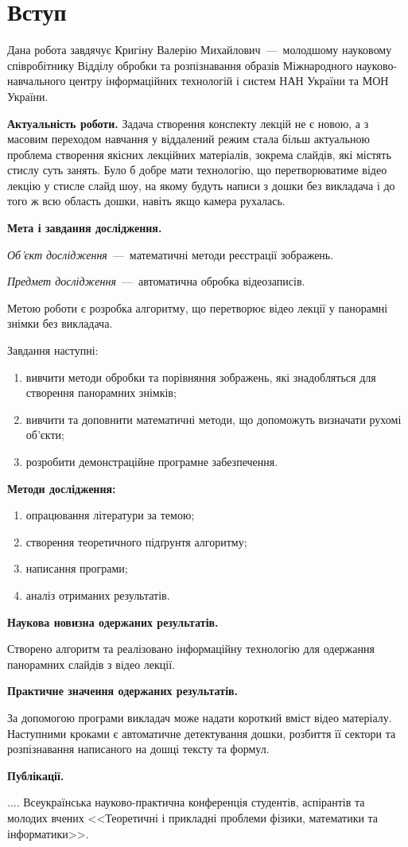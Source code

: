 \chapter*{Вступ}

Дана робота завдячує Кригіну Валерію Михайлович~---~молодшому
науковому співробітнику Відділу обробки та розпізнавання
образів Міжнародного науково-навчального центру інформаційних
технологій і систем НАН України та МОН України.

\textbf{Актуальність роботи.}
Задача створення конспекту лекцій не є новою,
а з масовим переходом навчання у віддалений режим
стала більш актуальною проблема створення якісних
лекційних матеріалів, зокрема слайдів, які містять
стислу суть занять. Було б добре мати технологію, що 
перетворюватиме відео лекцію у стисле слайд шоу, на 
якому будуть написи з дошки без викладача і до того 
ж всю область дошки, навіть якщо камера
рухалась.

\textbf{Мета і завдання дослідження.}

\textit{Об'єкт дослідження}~---~математичні методи 
реєстрації зображень.

\textit{Предмет дослідження}~---~автоматична обробка 
відеозаписів.

Метою роботи є розробка алгоритму, що перетворює відео 
лекції у панорамні знімки без викладача.

Завдання наступні:
\begin{enumerate}
  \item
    вивчити методи обробки та порівняння зображень, 
    які знадобляться для створення панорамних знімків;
    \item
    вивчити та доповнити математичні методи, 
    що допоможуть визначати рухомі об'єкти;
  \item
  розробити демонстраційне програмне забезпечення.
\end{enumerate}

\textbf{Методи дослідження:}
\begin{enumerate}
    \item опрацювання літератури за темою;
    \item створення теоретичного підґрунтя алгоритму;
    \item написання програми;
    \item аналіз отриманих результатів.
\end{enumerate}

\textbf{Наукова новизна одержаних результатів.}

Створено алгоритм та реалізовано інформаційну технологію 
для одержання панорамних слайдів з відео лекції.

\textbf{Практичне значення одержаних результатів.}

За допомогою програми викладач може надати короткий вміст 
відео матеріалу. Наступними кроками є автоматичне детектування 
дошки, розбиття її сектори та розпізнавання написаного на 
дошці тексту та формул.

\textbf{Публікації.}

.... Всеукраїнська науково-практична конференція студентів,
аспірантів та молодих вчених <<Теоретичні і прикладні проблеми фізики,
математики та інформатики>>.